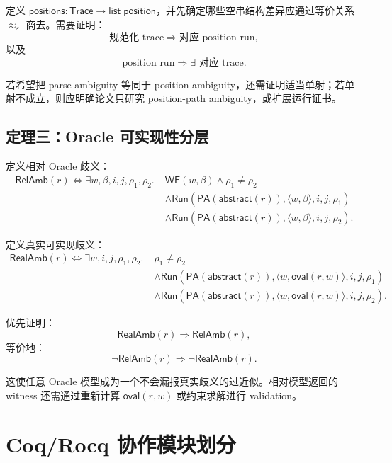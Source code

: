 \documentclass[UTF8,a4paper,12pt]{ctexart}
\newcommand{\PA}{\mathsf{PA}}
\newcommand{\Run}{\mathsf{Run}}
\newcommand{\Trace}{\mathsf{Trace}}
\newcommand{\RelAmb}{\mathsf{RelAmb}}
\newcommand{\RealAmb}{\mathsf{RealAmb}}
\newcommand{\ovalfn}{\mathsf{oval}}
\newcommand{\abstractfn}{\mathsf{abstract}}
\newcommand{\WF}{\mathsf{WF}}
\begin{document}
定义 $\mathsf{positions}:\Trace\to\mathsf{list}\;\mathsf{position}$，并先确定哪些空串结构差异应通过等价关系 $\approx_\varepsilon$ 商去。需要证明：
\[
\text{规范化 trace}
\Longrightarrow
\text{对应 position run},
\]
以及
\[
\text{position run}
\Longrightarrow
\exists\text{ 对应 trace}.
\]

若希望把 parse ambiguity 等同于 position ambiguity，还需证明适当单射；若单射不成立，则应明确论文只研究 position-path ambiguity，或扩展运行证书。

\subsection{定理三：Oracle 可实现性分层}

定义相对 Oracle 歧义：
\[
\begin{aligned}
\RelAmb(r)\iff
\exists w,\beta,i,j,\rho_1,\rho_2.\;&
\WF(w,\beta)\land\rho_1\neq\rho_2\\
&\land\Run(\PA(\abstractfn(r)),\langle w,\beta\rangle,i,j,\rho_1)\\
&\land\Run(\PA(\abstractfn(r)),\langle w,\beta\rangle,i,j,\rho_2).
\end{aligned}
\]

定义真实可实现歧义：
\[
\begin{aligned}
\RealAmb(r)\iff
\exists w,i,j,\rho_1,\rho_2.\;&
\rho_1\neq\rho_2\\
&\land\Run(\PA(\abstractfn(r)),\langle w,\ovalfn(r,w)\rangle,i,j,\rho_1)\\
&\land\Run(\PA(\abstractfn(r)),\langle w,\ovalfn(r,w)\rangle,i,j,\rho_2).
\end{aligned}
\]

优先证明：
\[
\RealAmb(r)\Rightarrow\RelAmb(r),
\]
等价地：
\[
\neg\RelAmb(r)\Rightarrow\neg\RealAmb(r).
\]

这使任意 Oracle 模型成为一个不会漏报真实歧义的过近似。相对模型返回的 witness 还需通过重新计算 $\ovalfn(r,w)$ 或约束求解进行 validation。

\section{Coq/Rocq 协作模块划分}
\end{document}
